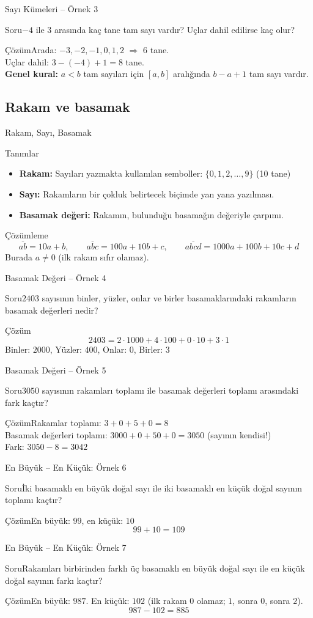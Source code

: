 \documentclass[aspectratio=169,11pt]{beamer}
\newcommand{\soru}[3]{%
\begin{frame}{#1}
  \begin{block}{Soru}\large #2\end{block}
  \pause
  \begin{exampleblock}{Çözüm}\large #3\end{exampleblock}
\end{frame}}
\newcommand{\ab}[1]{\overline{#1}}
\begin{document}
\soru{Sayı Kümeleri -- Örnek 3}
{\(-4\) ile \(3\) arasında kaç tane tam sayı vardır? Uçlar dahil edilirse kaç olur?}
{Arada: \(-3,-2,-1,0,1,2\) \(\Rightarrow\) \(6\) tane.\\[3pt]
Uçlar dahil: \(3-(-4)+1=8\) tane.\\[3pt]
\textbf{Genel kural:} \(a<b\) tam sayıları için \([a,b]\) aralığında \(b-a+1\) tam sayı vardır.}

\subsection{Rakam ve basamak}
\begin{frame}{Rakam, Sayı, Basamak}
\begin{block}{Tanımlar}
\begin{itemize}
\item \textbf{Rakam:} Sayıları yazmakta kullanılan semboller: \(\{0,1,2,\dots,9\}\) \quad (10 tane)
\item \textbf{Sayı:} Rakamların bir çokluk belirtecek biçimde yan yana yazılması.
\item \textbf{Basamak değeri:} Rakamın, bulunduğu basamağın değeriyle çarpımı.
\end{itemize}
\end{block}
\begin{block}{Çözümleme}
\[\ab{ab}=10a+b,\qquad \ab{abc}=100a+10b+c,\qquad \ab{abcd}=1000a+100b+10c+d\]
Burada \(a\neq 0\) (ilk rakam sıfır olamaz).
\end{block}
\end{frame}

\soru{Basamak Değeri -- Örnek 4}
{\(2403\) sayısının binler, yüzler, onlar ve birler basamaklarındaki rakamların basamak değerleri nedir?}
{\[2403=2\cdot 1000+4\cdot 100+0\cdot 10+3\cdot 1\]
Binler: \(2000\), \quad Yüzler: \(400\), \quad Onlar: \(0\), \quad Birler: \(3\)}

\soru{Basamak Değeri -- Örnek 5}
{\(3050\) sayısının rakamları toplamı ile basamak değerleri toplamı arasındaki fark kaçtır?}
{Rakamlar toplamı: \(3+0+5+0=8\)\\[3pt]
Basamak değerleri toplamı: \(3000+0+50+0=3050\) \quad (sayının kendisi!)\\[3pt]
Fark: \(3050-8=3042\)}

\soru{En Büyük -- En Küçük: Örnek 6}
{İki basamaklı en büyük doğal sayı ile iki basamaklı en küçük doğal sayının toplamı kaçtır?}
{En büyük: \(99\), \quad en küçük: \(10\)
\[99+10=109\]}

\soru{En Büyük -- En Küçük: Örnek 7}
{Rakamları birbirinden farklı üç basamaklı en büyük doğal sayı ile en küçük doğal sayının farkı kaçtır?}
{En büyük: \(987\). \quad En küçük: \(102\) \quad (ilk rakam \(0\) olamaz; \(1\), sonra \(0\), sonra \(2\)).
\[987-102=885\]}
\end{document}
